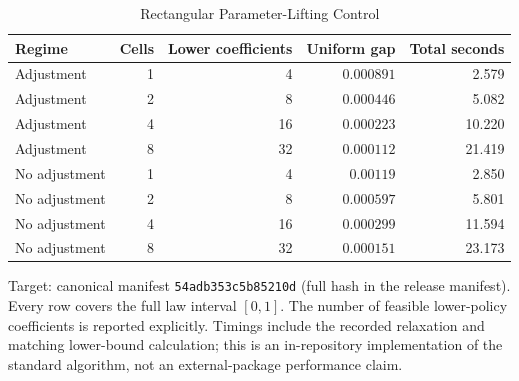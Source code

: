 \begin{table}[t]
\caption{Rectangular Parameter-Lifting Control}\label{tab:lifting}
\centering
\footnotesize
\begin{tabular}{@{}lrrrr@{}}
\toprule
Regime & Cells & Lower coefficients & Uniform gap & Total seconds \\
\midrule
Adjustment & 1 & 4 & $0.000891$ & 2.579 \\
Adjustment & 2 & 8 & $0.000446$ & 5.082 \\
Adjustment & 4 & 16 & $0.000223$ & 10.220 \\
Adjustment & 8 & 32 & $0.000112$ & 21.419 \\
No adjustment & 1 & 4 & $0.00119$ & 2.850 \\
No adjustment & 2 & 8 & $0.000597$ & 5.801 \\
No adjustment & 4 & 16 & $0.000299$ & 11.594 \\
No adjustment & 8 & 32 & $0.000151$ & 23.173 \\
\bottomrule
\end{tabular}
\par\smallskip\begin{minipage}{\linewidth}\footnotesize Target: canonical manifest \texttt{54adb353c5b85210d} (full hash in the release manifest). Every row covers the full law interval $[0,1]$. The number of feasible lower-policy coefficients is reported explicitly. Timings include the recorded relaxation and matching lower-bound calculation; this is an in-repository implementation of the standard algorithm, not an external-package performance claim.\end{minipage}
\end{table}
